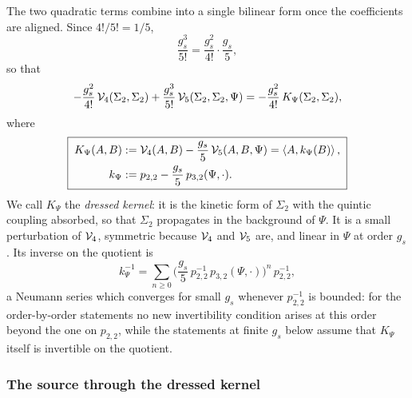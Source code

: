 The two quadratic terms combine into a single bilinear form once the coefficients are aligned.
Since $4!/5!=1/5$,
\begin{equation}
  \frac{g_s^3}{5!}
    = \frac{g_s^2}{4!} \cdot \frac{g_s}{5},
\end{equation}
so that
\begin{equation}
  \label{q:eq:square:absorb}
  - \frac{g_s^2}{4!} \, {\mathcal{V}}_4(\Sigma_2, \Sigma_2)
    + \frac{g_s^3}{5!} \, {\mathcal{V}}_5(\Sigma_2, \Sigma_2, \Psi)
    = - \frac{g_s^2}{4!} \, K_\Psi(\Sigma_2, \Sigma_2),
\end{equation}
where
\begin{equation}
  \label{q:eq:square:K}
  \boxed{\;
  \begin{aligned}
    K_\Psi(A, B)
      &
      := {\mathcal{V}}_4(A, B) - \frac{g_s}{5} \, {\mathcal{V}}_5(A, B, \Psi)
      = \braket{A, k_\Psi(B)},
    \\
    k_\Psi
      &
      := p_{2,2} - \frac{g_s}{5} \, p_{3,2}(\Psi, \cdot).
  \end{aligned}
  \;}
\end{equation}
We call $K_\Psi$ the \emph{dressed kernel}: it is the kinetic form of $\Sigma_2$ with the quintic coupling absorbed, so that $\Sigma_2$ propagates in the background of $\Psi$.
It is a small perturbation of ${\mathcal{V}}_4$, symmetric because ${\mathcal{V}}_4$ and ${\mathcal{V}}_5$ are, and linear in $\Psi$ at order $g_s$.
Its inverse on the quotient is
\begin{equation}
  \label{q:eq:square:neumann}
  k_\Psi^{-1}
    = \sum_{n \ge 0} \Big( \frac{g_s}{5} \, p_{2,2}^{-1} \, p_{3,2}(\Psi, \cdot) \Big)^n \, p_{2,2}^{-1},
\end{equation}
a Neumann series which converges for small $g_s$ whenever $p_{2,2}^{-1}$ is bounded: for the order-by-order statements no new invertibility condition arises at this order beyond the one on $p_{2,2}$, while the statements at finite $g_s$ below assume that $K_\Psi$ itself is invertible on the quotient.

\subsubsection{The source through the dressed kernel}
\label{q:sec:square:source}

